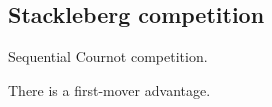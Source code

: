 
\subsection{Stackleberg competition}

Sequential Cournot competition.

There is a first-mover advantage.

